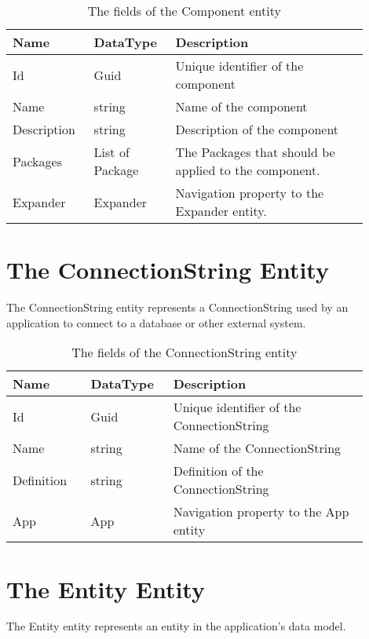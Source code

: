 \begin{table}[H]
\small
\begin{tabular}{ p{0.20\linewidth} p{0.20\linewidth} p{0.50\linewidth} }
\hline
\textbf{Name} & \textbf{DataType} & \textbf{Description} \\
\hline
Id & Guid & Unique identifier of the component \\
Name & string & Name of the component \\
Description & string & Description of the component \\
Packages & List of Package & The Packages that should be applied to the component. \\
Expander & Expander & Navigation property to the Expander entity. \\
\hline
\end{tabular}
\caption{The fields of the Component entity}
\label{table:component_entity}
\end{table}

\section{The ConnectionString Entity}

The ConnectionString entity represents a ConnectionString used by an application to
connect to a database or other external system.

\begin{table}[H]
\small
\begin{tabular}{ p{0.20\linewidth} p{0.20\linewidth} p{0.50\linewidth} }
\hline
\textbf{Name} & \textbf{DataType} & \textbf{Description} \\
\hline
Id & Guid & Unique identifier of the ConnectionString \\
Name & string & Name of the ConnectionString \\
Definition & string & Definition of the ConnectionString \\
App & App & Navigation property to the App entity \\
\hline
\end{tabular}
\caption{The fields of the ConnectionString entity}
\label{table:connectionstring_entity}
\end{table}

\section{The Entity Entity}

The Entity entity represents an entity in the application's data model. 

